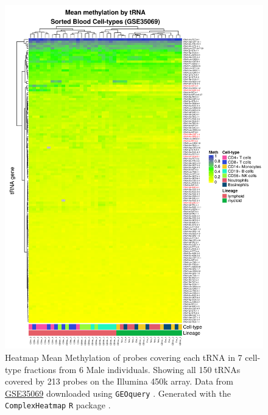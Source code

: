 \documentclass[]{book}
\begin{document}
\begin{figure}

{\centering \includegraphics[width=0.9\linewidth]{./figs/meanMethbytRNAMatHeatmapLow_bl} 

}

\caption{Heatmap Mean Methylation of probes covering each tRNA in 7 cell-type fractions from 6 Male individuals. Showing all 150 tRNAs covered by 213 probes on the Illumina 450k array. Data from \href{https://www.ncbi.nlm.nih.gov/geo/query/acc.cgi?acc=GSE35069}{GSE35069} \citep{Reinius2012} downloaded using \texttt{GEOquery} \citep{Davis2007p}. Generated with the \texttt{ComplexHeatmap} \texttt{R} package \citep{Gu2016}.}\label{fig:meanMethbytRNAMatHeatmapLow}
\end{figure}
\end{document}
